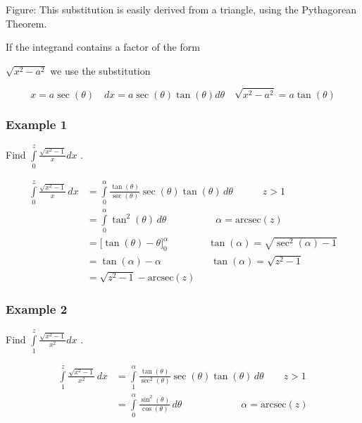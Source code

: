 

Figure: This substitution is easily derived from a triangle, using the Pythagorean Theorem.


If the integrand contains a factor of the form

$\displaystyle\sqrt{x^2-a^2}$ we use the substitution


\[
x=a\sec(\theta)\quad dx=a\sec(\theta)\tan(\theta)d\theta\quad\sqrt{x^2-a^2}=a\tan(\theta)
\]


\subsubsection{Example 1}
\label{sss:exam-acc3}


Find $\int\limits_0^z \frac{\sqrt{x^2-1}}{x}dx$ .


\begin{align}
\int\limits_0^z \frac{\sqrt{x^2-1}}{x}\,dx
&= \int\limits_0^\alpha \frac{\tan(\theta)}{\sec(\theta)}\sec(\theta)\tan(\theta)\,d\theta \quad\quad\quad z > 1 \\&= \int\limits_0^\alpha \tan^2(\theta)\,d\theta \quad\quad\quad\quad\quad \alpha = \text{arcsec}(z) \\&= \bigg[\tan(\theta) - \theta\bigg] _0^\alpha \quad\quad\quad\quad \tan(\alpha) = \sqrt{\sec^2(\alpha) - 1} \\&= \tan(\alpha) - \alpha \quad\quad\quad\quad\quad \tan(\alpha) = \sqrt{z^2 - 1} \\&= \sqrt{z^2 - 1} - \text{arcsec}(z)
\end{align}


\subsubsection{Example 2}
\label{sss:exam-5bdd}


Find $\int\limits_1^z \frac{\sqrt{x^2-1}}{x^2}dx$ .


\begin{align}
\int\limits_1^z \frac{\sqrt{x^2-1}}{x^2}\,dx 
&= \int\limits_1^\alpha \frac{\tan(\theta)}{\sec^2(\theta)}\sec(\theta)\tan(\theta)\,d\theta \qquad z > 1 \\&= \int\limits_0^\alpha \frac{\sin^2(\theta)}{\cos(\theta)}\,d\theta \qquad\qquad\qquad \alpha = \text{arcsec}(z)
\end{align}


